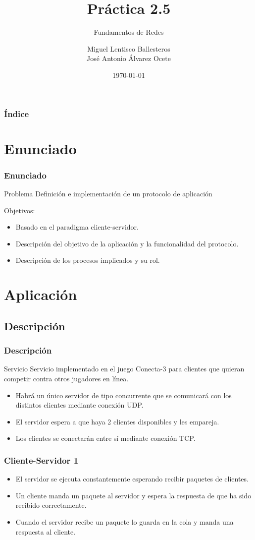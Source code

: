 \documentclass{beamer}
\title[Practica 2.5]{Práctica 2.5}
\subtitle{Fundamentos de Redes}
\author{Miguel Lentisco Ballesteros \\ José Antonio Álvarez Ocete}
\date{\today}
\begin{document}
\frame{\titlepage}

\begin{frame}
	\frametitle{Índice}
	\tableofcontents
\end{frame}

\section{Enunciado}
\begin{frame}
	\frametitle{Enunciado}
	\begin{block}{Problema}
		Definición e implementación de un protocolo de aplicación
	\end{block}
	\pause
	Objetivos:
	\pause
	\begin{itemize}
		\item<3->{Basado en el paradigma cliente-servidor.}
		\item<4->{Descripción del objetivo de la aplicación y la funcionalidad del protocolo.}
		\item<5->{Descripción de los procesos implicados y su rol.} 
	\end{itemize}	
\end{frame}

\section{Aplicación}

\subsection{Descripción}
\begin{frame}
	\frametitle{Descripción}
	\begin{block}{Servicio}
		Servicio implementado en el juego Conecta-3 para clientes que quieran competir contra otros jugadores en línea.
	\end{block}
	\pause
	\begin{itemize}
		\item Habrá un único servidor de tipo concurrente que se comunicará con los distintos clientes mediante conexión UDP.
		\pause
		\item El servidor espera a que haya 2 clientes disponibles y les empareja.
		\pause
		\item Los clientes se conectarán entre sí mediante conexión TCP.
	\end{itemize}
\end{frame}
	
\begin{frame}
	\frametitle{Cliente-Servidor 1}
	\begin{itemize}
		\item El servidor se ejecuta constantemente esperando recibir paquetes de clientes.
		\pause
		\item Un cliente manda un paquete al servidor y espera la respuesta de que ha sido recibido correctamente.
		\pause
		\item Cuando el servidor recibe un paquete lo guarda en la cola y manda una respuesta al cliente.
	\end{itemize}
\end{frame}
\end{document}
